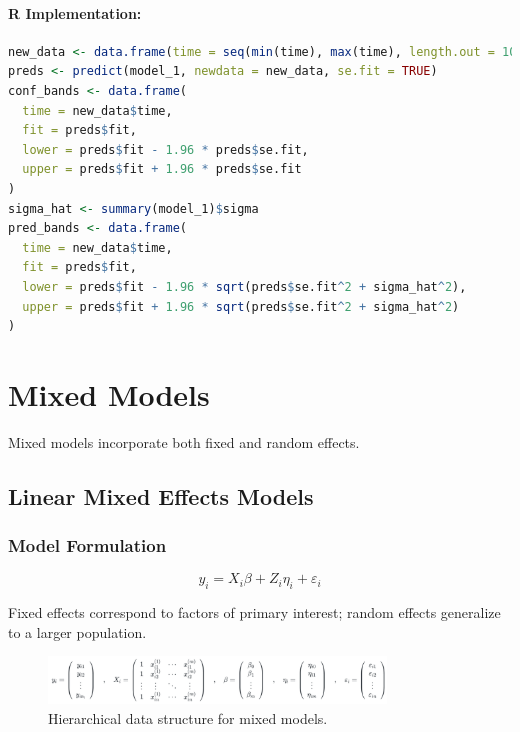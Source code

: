 \documentclass[11pt,a4paper]{article}
\begin{document}
\paragraph{R Implementation:}
\begin{lstlisting}[language=R]
new_data <- data.frame(time = seq(min(time), max(time), length.out = 100))
preds <- predict(model_1, newdata = new_data, se.fit = TRUE)
conf_bands <- data.frame(
  time = new_data$time,
  fit = preds$fit,
  lower = preds$fit - 1.96 * preds$se.fit,
  upper = preds$fit + 1.96 * preds$se.fit
)
sigma_hat <- summary(model_1)$sigma
pred_bands <- data.frame(
  time = new_data$time,
  fit = preds$fit,
  lower = preds$fit - 1.96 * sqrt(preds$se.fit^2 + sigma_hat^2),
  upper = preds$fit + 1.96 * sqrt(preds$se.fit^2 + sigma_hat^2)
)
\end{lstlisting}

\newpage

\section{Mixed Models}

Mixed models incorporate both fixed and random effects.

\subsection{Linear Mixed Effects Models}

\subsubsection{Model Formulation}
\begin{equation}
y_i = X_i\beta + Z_i\eta_i + \varepsilon_i
\end{equation}

\begin{tipbox}
Fixed effects correspond to factors of primary interest; random effects generalize to a larger population.
\end{tipbox}

\begin{figure}[htb]
    \centering
    \includegraphics[width=0.8\textwidth]{hierarchical-structure.png}
    \caption{Hierarchical data structure for mixed models.}
    \label{fig:hierarchical-structure}
\end{figure}
\end{document}
